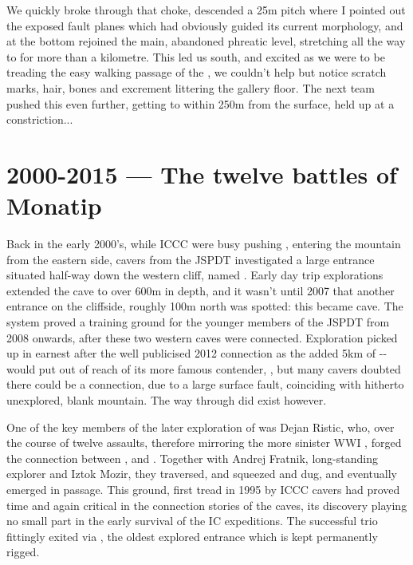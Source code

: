 We quickly broke through that choke, descended a 25m pitch where I pointed out the exposed fault planes which had obviously guided its current morphology, and at the bottom rejoined the main, abandoned phreatic level, stretching all the way to  for more than a kilometre. This led us south, and excited as we were to be treading the easy walking passage of the , we couldn't help but notice scratch marks, hair, bones and excrement littering the gallery floor. The next team pushed this even further, getting to within 250m from the surface, held up at a constriction...

\section{2000-2015 --- The twelve battles of Monatip}
\label{sec:early primadona}
Back in the early 2000's, while ICCC were busy pushing , entering the mountain from the eastern side, cavers from the JSPDT investigated a large entrance situated half-way down the western cliff, named . Early day trip explorations extended the cave to over 600m in depth, and it wasn't until 2007 that another entrance  on the cliffside, roughly 100m north was spotted: this became  cave. The system proved a training ground for the younger members of the JSPDT from 2008 onwards, after these two western caves were connected. Exploration picked up in earnest after the well publicised 2012 connection as the added 5km of -- would put  out of reach of its more famous contender, , but many cavers doubted there could be a connection, due to a large surface fault, coinciding with hitherto unexplored, blank mountain. The way through did exist however.

One of the key members of the later exploration of  was Dejan Ristic, who, over the course of twelve assaults, therefore mirroring the more sinister WWI , forged the connection between , and . Together with Andrej Fratnik, long-standing  explorer and Iztok Mozir, they traversed, and squeezed and dug, and eventually emerged in  passage. This ground, first tread in 1995 by ICCC cavers had proved time and again critical in the connection stories of the  caves, its discovery playing no small part in the early survival of the IC expeditions. The successful trio fittingly exited via , the oldest explored entrance which is kept permanently rigged.

